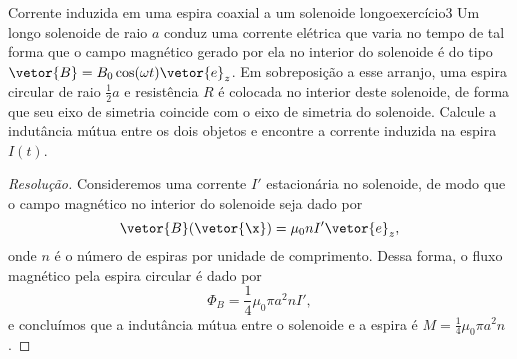 \begin{exercício}{Corrente induzida em uma espira coaxial a um solenoide longo}{exercício3}
    Um longo solenoide de raio \(a\) conduz uma corrente elétrica que varia no tempo de tal forma que o campo magnético gerado por ela no interior do solenoide é do tipo \(\vetor{B} = B_0 \cos(\omega t) \vetor{e}_z\). Em sobreposição a esse arranjo, uma espira circular de raio \(\frac12a\) e resistência \(R\) é colocada no interior deste solenoide, de forma que seu eixo de simetria coincide com o eixo de simetria do solenoide. Calcule a indutância mútua entre os dois objetos e encontre a corrente induzida na espira \(I(t)\).
\end{exercício}
\begin{proof}[Resolução]
    Consideremos uma corrente \(I'\) estacionária no solenoide, de modo que o campo magnético no interior do solenoide seja dado por
    \begin{equation*}
        \vetor{B}(\vetor{\x}) = \mu_0 n I' \vetor{e}_z,
    \end{equation*}
    onde \(n\) é o número de espiras por unidade de comprimento. Dessa forma, o fluxo magnético pela espira circular é dado por
    \begin{equation*}
        \Phi_B = \frac14\mu_0 \pi a^2 n I',
    \end{equation*}
    e concluímos que a indutância mútua entre o solenoide e a espira é \(M = \frac14\mu_0 \pi a^2 n\). 
\end{proof}
